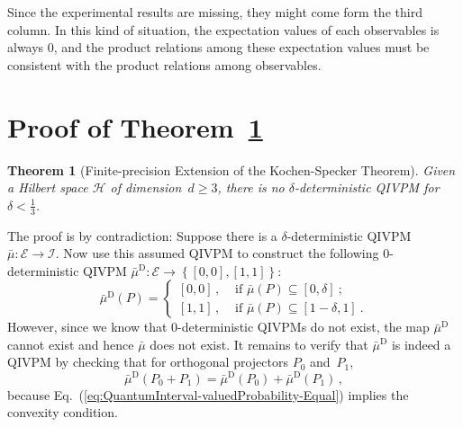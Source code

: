 \documentclass[english,reprint, aps, prl,superscriptaddress, showpacs,
showkeys, longbibliography, amsmath, amssymb, floatfix]{revtex4-1}
\theoremstyle{plain}
\newtheorem{thm}{Theorem}
\theoremstyle{definition}
\newcommand{\Hilb}{\mathcal{H}}
\newcommand{\events}{\ensuremath{\mathcal{E}}}
\newcommand{\imposs}{\ensuremath{\left[0,0\right]}}
\newcommand{\necess}{\ensuremath{\left[1,1\right]}}
\begin{document}
\noindent Since the experimental results are missing, they might come
form the third column. In this kind of situation, the expectation
values of each observables is always $0$, and the product relations
among these expectation values must be consistent with the product
relations among observables.



\appendix

\section{\label{sec:Proof-of-Theorem}Proof of Theorem~\ref{cor:Kochen-Specker-IVPM}}

\begin{thm}[Finite-precision Extension of the Kochen-Specker Theorem]
\label{cor:Kochen-Specker-IVPM} Given a Hilbert space $\Hilb$ of
dimension~$d\ge3$, there is no $\delta$-deterministic QIVPM for
$\delta<\frac{1}{3}$.\end{thm}

The proof is by contradiction: Suppose there is a $\delta$-deterministic
QIVPM~$\bar{\mu}:\events\rightarrow\mathscr{I}$. Now use this assumed
QIVPM to construct the following $0$-deterministic QIVPM $\bar{\mu}^{\textrm{D}}:\events\rightarrow\left\{ \imposs,\necess\right\} $:
\begin{equation}
\bar{\mu}^{\textrm{D}}\left(P\right)=\begin{cases}
\imposs\,, & \textrm{ if }\bar{\mu}\left(P\right)\subseteq\left[0,\delta\right]\:;\\
\necess\,, & \textrm{ if }\bar{\mu}\left(P\right)\subseteq\left[1-\delta,1\right]\:.
\end{cases}
\end{equation}
However, since we know that $0$-deterministic QIVPMs do not exist,
the map $\bar{\mu}^{\textrm{D}}$ cannot exist and hence $\bar{\mu}$
does not exist. It remains to verify that $\bar{\mu}^{\textrm{D}}$
is indeed a QIVPM by checking that for orthogonal projectors $P_{0}$
and~$P_{1}$, 
\begin{equation}
\bar{\mu}^{\textrm{D}}\left(P_{0}+P_{1}\right)=\bar{\mu}^{\textrm{D}}\left(P_{0}\right)+\bar{\mu}^{\textrm{D}}\left(P_{1}\right)\,,\label{eq:QuantumInterval-valuedProbability-Equal}
\end{equation}
because Eq.~(\ref{eq:QuantumInterval-valuedProbability-Equal}) implies
the convexity condition.
\end{document}

